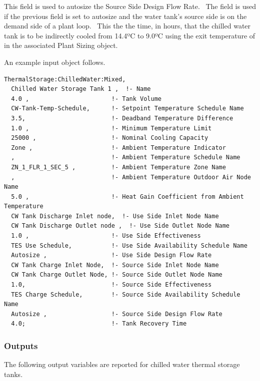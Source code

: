 This field is used to autosize the Source Side Design Flow Rate.~ The field is used if the previous field is set to autosize and the water tank's source side is on the demand side of a plant loop.~ This the the time, in hours, that the chilled water tank is to be indirectly cooled from 14.4ºC to 9.0ºC using the exit temperature of in the associated Plant Sizing object.

An example input object follows.

\begin{lstlisting}
ThermalStorage:ChilledWater:Mixed,
  Chilled Water Storage Tank 1 ,  !- Name
  4.0 ,                       !- Tank Volume
  CW-Tank-Temp-Schedule,      !- Setpoint Temperature Schedule Name
  3.5,                        !- Deadband Temperature Difference
  1.0 ,                       !- Minimum Temperature Limit
  25000 ,                     !- Nominal Cooling Capacity
  Zone ,                      !- Ambient Temperature Indicator
  ,                           !- Ambient Temperature Schedule Name
  ZN_1_FLR_1_SEC_5 ,          !- Ambient Temperature Zone Name
  ,                           !- Ambient Temperature Outdoor Air Node Name
  5.0 ,                       !- Heat Gain Coefficient from Ambient Temperature
  CW Tank Discharge Inlet node,  !- Use Side Inlet Node Name
  CW Tank Discharge Outlet node ,  !- Use Side Outlet Node Name
  1.0 ,                       !- Use Side Effectiveness
  TES Use Schedule,           !- Use Side Availability Schedule Name
  Autosize ,                  !- Use Side Design Flow Rate
  CW Tank Charge Inlet Node,  !- Source Side Inlet Node Name
  CW Tank Charge Outlet Node, !- Source Side Outlet Node Name
  1.0,                        !- Source Side Effectiveness
  TES Charge Schedule,        !- Source Side Availability Schedule Name
  Autosize ,                  !- Source Side Design Flow Rate
  4.0;                        !- Tank Recovery Time
\end{lstlisting}

\subsubsection{Outputs}\label{outputs-20-000}

The following output variables are reported for chilled water thermal storage tanks.

